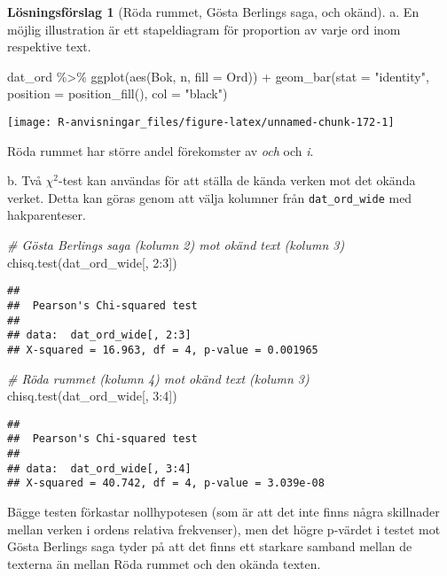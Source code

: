\documentclass[
]{book}
\newenvironment{Shaded}{\begin{snugshade}}{\end{snugshade}}
\newcommand{\AttributeTok}[1]{\textcolor[rgb]{0.77,0.63,0.00}{#1}}
\newcommand{\CommentTok}[1]{\textcolor[rgb]{0.56,0.35,0.01}{\textit{#1}}}
\newcommand{\DecValTok}[1]{\textcolor[rgb]{0.00,0.00,0.81}{#1}}
\newcommand{\FunctionTok}[1]{\textcolor[rgb]{0.00,0.00,0.00}{#1}}
\newcommand{\NormalTok}[1]{#1}
\newcommand{\SpecialCharTok}[1]{\textcolor[rgb]{0.00,0.00,0.00}{#1}}
\newcommand{\StringTok}[1]{\textcolor[rgb]{0.31,0.60,0.02}{#1}}
\theoremstyle{definition}
\theoremstyle{definition}
\theoremstyle{definition}
\theoremstyle{definition}
\newtheorem{hypothesis}{Lösningsförslag}[chapter]
\theoremstyle{remark}
\begin{document}
\begin{hypothesis}[Röda rummet, Gösta Berlings saga, och okänd]
a. En möjlig illustration är ett stapeldiagram för proportion av varje ord inom respektive text.

\begin{Shaded}
\begin{Highlighting}[]
\NormalTok{dat\_ord }\SpecialCharTok{\%\textgreater{}\%}
  \FunctionTok{ggplot}\NormalTok{(}\FunctionTok{aes}\NormalTok{(Bok, n, }\AttributeTok{fill =}\NormalTok{ Ord)) }\SpecialCharTok{+}
  \FunctionTok{geom\_bar}\NormalTok{(}\AttributeTok{stat =} \StringTok{"identity"}\NormalTok{, }\AttributeTok{position =} \FunctionTok{position\_fill}\NormalTok{(), }\AttributeTok{col =} \StringTok{"black"}\NormalTok{)}
\end{Highlighting}
\end{Shaded}

\begin{center}\texttt{[image: R-anvisningar\_files/figure-latex/unnamed-chunk-172-1]} \end{center}

Röda rummet har större andel förekomster av \emph{och} och \emph{i}.

b. Två \(\chi^2\)-test kan användas för att ställa de kända verken mot det okända verket. Detta kan göras genom att välja kolumner från \texttt{dat\_ord\_wide} med hakparenteser.

\begin{Shaded}
\begin{Highlighting}[]
\CommentTok{\# Gösta Berlings saga (kolumn 2) mot okänd text (kolumn 3)}
\FunctionTok{chisq.test}\NormalTok{(dat\_ord\_wide[, }\DecValTok{2}\SpecialCharTok{:}\DecValTok{3}\NormalTok{])}
\end{Highlighting}
\end{Shaded}

\begin{verbatim}
## 
##  Pearson's Chi-squared test
## 
## data:  dat_ord_wide[, 2:3]
## X-squared = 16.963, df = 4, p-value = 0.001965
\end{verbatim}

\begin{Shaded}
\begin{Highlighting}[]
\CommentTok{\# Röda rummet (kolumn 4) mot okänd text (kolumn 3)}
\FunctionTok{chisq.test}\NormalTok{(dat\_ord\_wide[, }\DecValTok{3}\SpecialCharTok{:}\DecValTok{4}\NormalTok{])}
\end{Highlighting}
\end{Shaded}

\begin{verbatim}
## 
##  Pearson's Chi-squared test
## 
## data:  dat_ord_wide[, 3:4]
## X-squared = 40.742, df = 4, p-value = 3.039e-08
\end{verbatim}

Bägge testen förkastar nollhypotesen (som är att det inte finns några skillnader mellan verken i ordens relativa frekvenser), men det högre p-värdet i testet mot Gösta Berlings saga tyder på att det finns ett starkare samband mellan de texterna än mellan Röda rummet och den okända texten.
\end{hypothesis}
\end{document}
